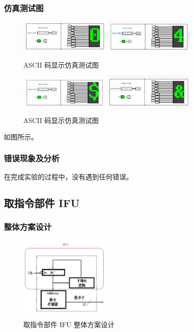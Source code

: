 \documentclass{article}
\begin{document}
    \subsubsection{仿真测试图}
    \begin{figure}[H]
    \centering
    \includegraphics[width=0.4\textwidth]{2.5.1.png}
    \includegraphics[width=0.4\textwidth]{2.5.2.png}
        
    \caption{ASCII 码显示仿真测试图}
    \end{figure}

    \begin{figure}[H]
    \centering
    \includegraphics[width=0.4\textwidth]{2.5.3.png}
    \includegraphics[width=0.4\textwidth]{2.5.4.png}
    \caption{ASCII 码显示仿真测试图}
    \end{figure}
    如图所示。

    \subsubsection{错误现象及分析}
    在完成实验的过程中，没有遇到任何错误。

    \subsection{取指令部件 IFU}

    \subsubsection{整体方案设计}
    \begin{figure}[H]
    \centering
    \includegraphics[width=0.4\textwidth]{3.1.png}
    \caption{取指令部件 IFU 整体方案设计}
    \end{figure}
\end{document}
